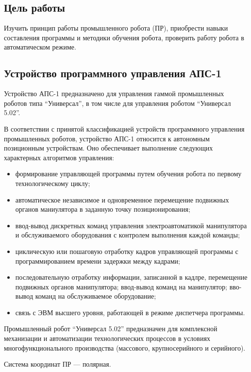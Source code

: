 \subsection*{Цель работы}

Изучить принцип работы промышленного робота (ПР), приобрести навыки составления программы и методики обучения робота, проверить работу робота в автоматическом режиме.

\subsection*{Устройство программного управления АПС-1}

Устройство АПС-1 предназначено для управления гаммой промышленных роботов типа ``Универсал'', в том числе для управления роботом ``Универсал 5.02''.

В соответствии с принятой классификацией устройств программного управления промышленных роботов, устройство АПС-1 относится к автономным позиционным устройствам. Оно обеспечивает выполнение следующих характерных алгоритмов управления:

\begin{itemize}
    \item формирование управляющей программы путем обучения робота по первому технологическому циклу;
    \item автоматическое независимое и одновременное перемещение подвижных органов маниулятора в заданную точку позиционирования;
    \item ввод-вывод дискретных команд управления электроавтоматикой манипулятора и обслуживаемого оборудования с контролем выполнения каждой команды;
    \item циклическую или пошаговую отработку кадров управляющей программы с программированием времени задержки между кадрами;
    \item последовательную отработку информации, записанной в кадлре, перемещение подвижных органов манипулятора; ввод-вывод команд на манипулятор; вво-вывод команд на обслуживаемое оборудование;
    \item связь с ЭВМ высшего уровня, работающей в режиме диспетчера программы.
\end{itemize}

Промышленный робот ``Универсал 5.02'' предназначен для комплексной механизации и автоматизации технологических процессов в условиях многофункционального производства (массового, крупносерийного и серийного).

Система координат ПР --- полярная.

